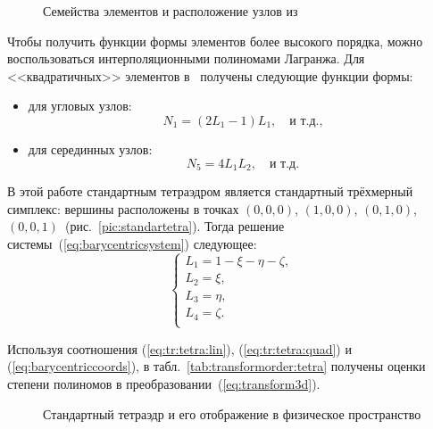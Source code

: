 \begin{figure}[t]
	{\centering
		\hfill
		\hfill
		\hfill
	}
	\caption{Семейства элементов и расположение узлов из~\cite{Zienkiewicz:2000:en}}
	\label{pic:nodesorder}
\end{figure}

Чтобы получить функции формы элементов более высокого порядка, можно воспользоваться интерполяционными полиномами Лагранжа. Для <<квадратичных>> элементов в~\cite{Zienkiewicz:2000:en} получены следующие функции формы:
\begin{itemize}
	\item для угловых узлов:
	\begin{equation}\label{eq:tr:tetra:quad}
	N_1 = (2L_1 - 1)L_1,\quad \text{и т.д.,}
	\end{equation}
	\item для серединных узлов:
	\[
	N_5 = 4L_1L_2, \quad \text{и т.д.}
	\]
\end{itemize}

В этой работе стандартным тетраэдром является стандартный трёхмерный симплекс: вершины расположены в точках \((0, 0, 0)\), \((1, 0, 0)\), \((0, 1, 0)\), \((0, 0, 1)\)~(рис.~\ref{pic:standartetra}). Тогда решение системы~(\ref{eq:barycentricsystem}) следующее:
\begin{equation}\label{eq:barycentriccoords}
\left\{\begin{array}{l}
L_1 = 1 - \xi - \eta - \zeta, \\
L_2 = \xi, \\
L_3 = \eta, \\
L_4 = \zeta. \\
\end{array}\right.
\end{equation}

Используя соотношения (\ref{eq:tr:tetra:lin}), (\ref{eq:tr:tetra:quad}) и (\ref{eq:barycentriccoords}), в табл.~\ref{tab:transformorder:tetra} получены оценки степени полиномов в преобразовании~(\ref{eq:transform3d}).

\begin{figure}[h]
	{\centering
		\hfill
		\hfill
		\hfill
	}
	\caption{Стандартный тетраэдр и его отображение в физическое пространство}
	\label{pic:tetratransform}
\end{figure}

